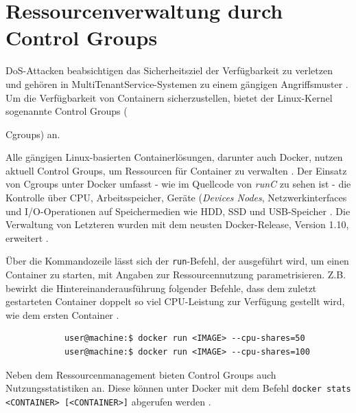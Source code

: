 \documentclass[../main.tex]{subfiles}
\begin{document}
	\section{Ressourcenverwaltung durch Control Groups}
  \label{secCgroups}
		\acrshort{DoS}-Attacken beabsichtigen das Sicherheitsziel der Verfügbarkeit zu verletzen und gehören in \gls{MultiTenantService}-Systemen zu einem gängigen Angriffsmuster \cite[S.5]{dockerSec1}. Um die Verfügbarkeit von Containern sicherzustellen, bietet der Linux-Kernel sogenannte Control Groups ({\acrshort{Cgroups}) an.

		Alle gängigen Linux-basierten Containerlösungen, darunter auch Docker, nutzen aktuell Control Groups, um Ressourcen für Container zu verwalten \cite[S.16]{dockerSec2}. Der Einsatz von Cgroups unter Docker umfasst - wie im Quellcode von \emph{runC} zu sehen ist - die Kontrolle über \acrshort{CPU}, Arbeitsspeicher, Geräte (\emph{Devices Nodes}, Netzwerkinterfaces und \acrshort{I/O}-Operationen auf Speichermedien wie \acrshort{HDD}, \acrshort{SSD} und \acrshort{USB}-Speicher \cite{cgroupsRedhat}\cite{githubRunCCgroups}. Die Verwaltung von Letzteren wurden mit dem neusten Docker-Release, Version 1.10, erweitert \cite{docker110}.


		Über die Kommandozeile lässt sich der \texttt{run}-Befehl, der ausgeführt wird, um einen Container zu starten, mit Angaben zur Ressourcennutzung parametrisieren. Z.B. bewirkt die Hintereinanderausführung folgender Befehle, dass dem zuletzt gestarteten Container doppelt so viel CPU-Leistung zur Verfügung gestellt wird, wie dem ersten Container \cite{dockerRun}.

		\begin{lstlisting}
			user@machine:$ docker run <IMAGE> --cpu-shares=50
			user@machine:$ docker run <IMAGE> --cpu-shares=100
		\end{lstlisting}

		Neben dem Ressourcenmanagement bieten Control Groups auch Nutzungsstatistiken an. Diese können unter Docker mit dem Befehl \texttt{docker stats <CONTAINER> [<CONTAINER>]} abgerufen werden \cite{dockerMetrics}.

}
\end{document}
